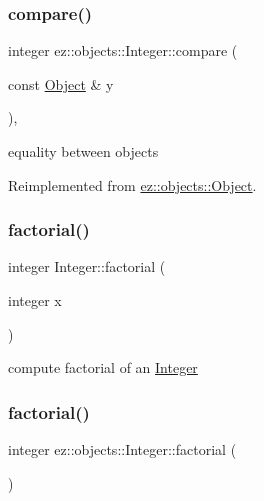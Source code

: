 \subsubsection{\texorpdfstring{compare()}{compare()}}
{\footnotesize\ttfamily integer ez\+::objects\+::\+Integer\+::compare (\begin{DoxyParamCaption}\item[{const \hyperlink{classez_1_1objects_1_1Object}{Object} \&}]{y }\end{DoxyParamCaption})\hspace{0.3cm}{\ttfamily [inline]}, {\ttfamily [virtual]}}

equality between objects 

Reimplemented from \hyperlink{classez_1_1objects_1_1Object_aca311d389dffa204e425463145f4e1e6}{ez\+::objects\+::\+Object}.

\mbox{\label{classez_1_1objects_1_1Integer_a16573c56739262f5a869774c2a090d27}} 
\subsubsection{\texorpdfstring{factorial()}{factorial()}\hspace{0.1cm}{\footnotesize\ttfamily [1/2]}}
{\footnotesize\ttfamily integer Integer\+::factorial (\begin{DoxyParamCaption}\item[{integer}]{x }\end{DoxyParamCaption})\hspace{0.3cm}{\ttfamily [static]}}

compute factorial of an \hyperlink{classez_1_1objects_1_1Integer}{Integer} \mbox{\label{classez_1_1objects_1_1Integer_a037a0eb32dd0f3d24cb54de41c199600}} 
\subsubsection{\texorpdfstring{factorial()}{factorial()}\hspace{0.1cm}{\footnotesize\ttfamily [2/2]}}
{\footnotesize\ttfamily integer ez\+::objects\+::\+Integer\+::factorial (\begin{DoxyParamCaption}{ }\end{DoxyParamCaption})\hspace{0.3cm}{\ttfamily [inline]}}

